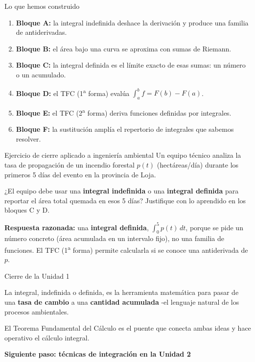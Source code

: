 \documentclass[aspectratio=169,11pt]{beamer}
\begin{document}
\begin{frame}{Lo que hemos construido}
\small
\begin{enumerate}
  \item \textbf{Bloque A:} la integral indefinida deshace la derivación y produce una familia de antiderivadas.
  \item \textbf{Bloque B:} el área bajo una curva se aproxima con sumas de Riemann.
  \item \textbf{Bloque C:} la integral definida es el límite exacto de esas sumas: un número o un acumulado.
  \item \textbf{Bloque D:} el TFC (1\textsuperscript{a} forma) evalúa $\int_a^b f = F(b)-F(a)$.
  \item \textbf{Bloque E:} el TFC (2\textsuperscript{a} forma) deriva funciones definidas por integrales.
  \item \textbf{Bloque F:} la sustitución amplía el repertorio de integrales que sabemos resolver.
\end{enumerate}
\end{frame}

\begin{frame}{Ejercicio de cierre aplicado a ingeniería ambiental}
\small
Un equipo técnico analiza la tasa de propagación de un incendio forestal $p(t)$ (hectáreas/día) durante los primeros 5 días del evento en la provincia de Loja.
\vspace{0.15cm}
\begin{checkbox}
¿El equipo debe usar una \textbf{integral indefinida} o una \textbf{integral definida} para reportar el área total quemada en esos 5 días? Justifique con lo aprendido en los bloques C y D.
\end{checkbox}
\vspace{0.2cm}
\begin{keybox}
\textbf{Respuesta razonada:} una \textbf{integral definida}, $\int_0^5 p(t)\,dt$, porque se pide un número concreto (área acumulada en un intervalo fijo), no una familia de funciones. El TFC (1\textsuperscript{a} forma) permite calcularla si se conoce una antiderivada de $p$.
\end{keybox}
\end{frame}

\begin{frame}{Cierre de la Unidad 1}
\begin{keybox}
La integral, indefinida o definida, es la herramienta matemática para pasar de una \textbf{tasa de cambio} a una \textbf{cantidad acumulada} -el lenguaje natural de los procesos ambientales.
\end{keybox}
\begin{keybox}
El Teorema Fundamental del Cálculo es el puente que conecta ambas ideas y hace operativo el cálculo integral.
\end{keybox}
\vspace{0.1cm}
\begin{center}
\Large\textbf{Siguiente paso: técnicas de integración en la Unidad 2}
\end{center}
\end{frame}
\end{document}
